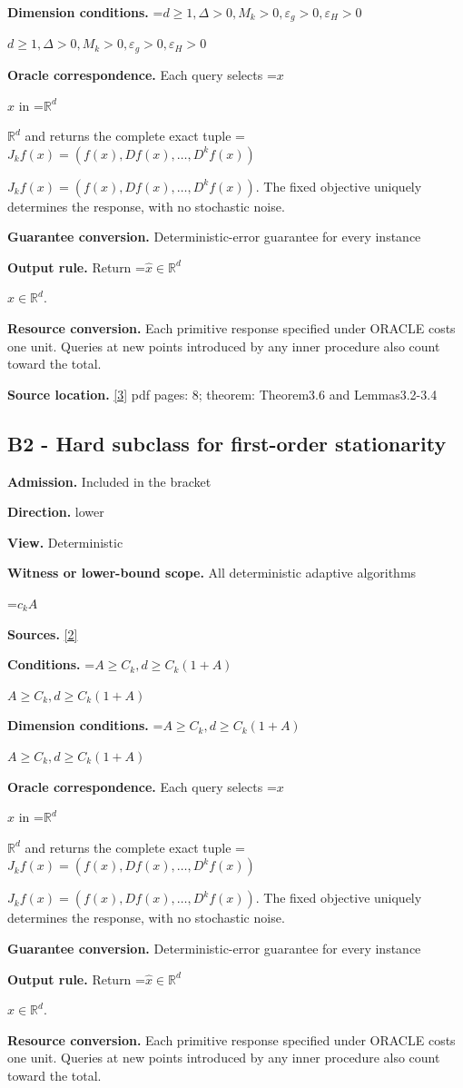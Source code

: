 \documentclass[10pt,a4paper]{article}
\newcommand{\AtlasMath}[1]{\par\begingroup\centering\setbox0=\hbox{$\displaystyle #1$}\ifdim\wd0>1.4\linewidth\typeout{ATLAS WIDE FORMULA: \the\wd0}\fi\ifdim\wd0>\linewidth\resizebox{\linewidth}{!}{\box0}\else\box0\fi\par\endgroup}
\newcommand{\AtlasInlineMath}[1]{\begingroup\setbox0=\hbox{$#1$}\ifdim\wd0>.4\linewidth\endgroup\AtlasMath{#1}\else\endgroup$#1$\fi}
\begin{document}
\textbf{Dimension conditions.} \AtlasInlineMath{d\ge 1,\Delta>0,M_k>0,\varepsilon_g>0,\varepsilon_H>0}

\textbf{Oracle correspondence.} Each query selects \AtlasInlineMath{x} in \AtlasInlineMath{\mathbb{R}^d} and returns the complete exact tuple \AtlasInlineMath{J_{k}f(x)=(f(x),Df(x),\ldots,D^{k}f(x))}. The fixed objective uniquely determines the response, with no stochastic noise.

\textbf{Guarantee conversion.} Deterministic-error guarantee for every instance

\textbf{Output rule.} Return \AtlasInlineMath{\widehat{x}\in \mathbb{R}^d}.

\textbf{Resource conversion.} Each primitive response specified under ORACLE costs one unit. Queries at new points introduced by any inner procedure also count toward the total.

\textbf{Source location.} \href{https://arxiv.org/abs/1708.04044}{[3]} pdf pages: 8; theorem: Theorem3.6 and Lemmas3.2-3.4

\subsection{B2 - Hard subclass for first-order stationarity}
\textbf{Admission.} Included in the bracket

\textbf{Direction.} lower

\textbf{View.} Deterministic

\textbf{Witness or lower-bound scope.} All deterministic adaptive algorithms

\AtlasMath{c_k A}
\textbf{Sources.} \href{https://arxiv.org/abs/1710.11606}{[2]}

\textbf{Conditions.} \AtlasInlineMath{A\ge C_k,d\ge C_k(1+A)}

\textbf{Dimension conditions.} \AtlasInlineMath{A\ge C_k,d\ge C_k(1+A)}

\textbf{Oracle correspondence.} Each query selects \AtlasInlineMath{x} in \AtlasInlineMath{\mathbb{R}^d} and returns the complete exact tuple \AtlasInlineMath{J_{k}f(x)=(f(x),Df(x),\ldots,D^{k}f(x))}. The fixed objective uniquely determines the response, with no stochastic noise.

\textbf{Guarantee conversion.} Deterministic-error guarantee for every instance

\textbf{Output rule.} Return \AtlasInlineMath{\widehat{x}\in \mathbb{R}^d}.

\textbf{Resource conversion.} Each primitive response specified under ORACLE costs one unit. Queries at new points introduced by any inner procedure also count toward the total.
\end{document}
